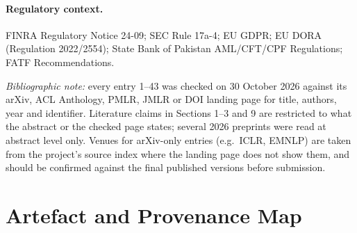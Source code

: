 \documentclass[letterpaper]{article}
\begin{document}
\nocite{*}


\paragraph{Regulatory context.} FINRA Regulatory Notice 24-09; SEC Rule 17a-4; EU GDPR; EU DORA (Regulation 2022/2554); State Bank of Pakistan AML/CFT/CPF Regulations; FATF Recommendations.

\emph{Bibliographic note:} every entry 1--43 was checked on 30 October 2026 against its arXiv, ACL Anthology, PMLR, JMLR or DOI landing page for title, authors, year and identifier. Literature claims in Sections 1--3 and 9 are restricted to what the abstract or the checked page states; several 2026 preprints were read at abstract level only. Venues for arXiv-only entries (e.g.~ICLR, EMNLP) are taken from the project's source index where the landing page does not show them, and should be confirmed against the final published versions before submission.

\appendix

\section{Artefact and Provenance Map}\label{appendix-a.-artefact-and-provenance-map}
\end{document}
